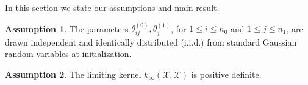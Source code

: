 \documentclass{article}
\theoremstyle{definition}
\newtheorem{ass}{Assumption}
\theoremstyle{remark}
\newtheorem{rem}[thm]{Remark}
\numberwithin{equation}{section}
\newcommand{\X}{\mathcal{X}}
\newcommand{\R}{\mathbb{R}}
\begin{document}

In this section we state our assumptions and main result.
\begin{ass}
    \label{ass:gaussian_initialization}
    The parameters $\theta^{(0)}_{ij}, \theta^{(1)}_j$, for $1 \le i \le n_0$ and $1 \le j \le n_1$, are drawn independent and identically distributed (i.i.d.) from standard Gaussian random variables at initialization.
\end{ass}
\begin{ass}
    \label{ass:positivity_kinf}
    The limiting kernel $k_\infty(\X,\X)$ is positive definite.
\end{ass}
\end{document}
